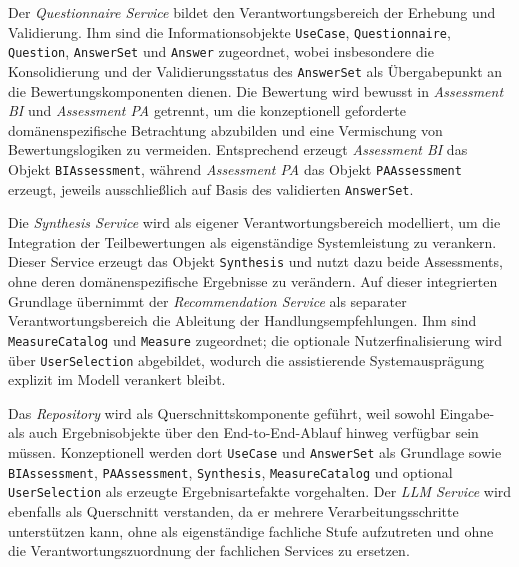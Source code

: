 Der \textit{Questionnaire Service} bildet den Verantwortungsbereich der Erhebung und Validierung. Ihm sind die Informationsobjekte \texttt{UseCase}, \texttt{Questionnaire}, \texttt{Question}, \texttt{AnswerSet} und \texttt{Answer} zugeordnet, wobei insbesondere die Konsolidierung und der Validierungsstatus des \texttt{AnswerSet} als Übergabepunkt an die Bewertungskomponenten dienen. Die Bewertung wird bewusst in \textit{Assessment BI} und \textit{Assessment PA} getrennt, um die konzeptionell geforderte domänenspezifische Betrachtung abzubilden und eine Vermischung von Bewertungslogiken zu vermeiden. Entsprechend erzeugt \textit{Assessment BI} das Objekt \texttt{BIAssessment}, während \textit{Assessment PA} das Objekt \texttt{PAAssessment} erzeugt, jeweils ausschließlich auf Basis des validierten \texttt{AnswerSet}.

Die \textit{Synthesis Service} wird als eigener Verantwortungsbereich modelliert, um die Integration der Teilbewertungen als eigenständige Systemleistung zu verankern. Dieser Service erzeugt das Objekt \texttt{Synthesis} und nutzt dazu beide Assessments, ohne deren domänenspezifische Ergebnisse zu verändern. Auf dieser integrierten Grundlage übernimmt der \textit{Recommendation Service} als separater Verantwortungsbereich die Ableitung der Handlungsempfehlungen. Ihm sind \texttt{MeasureCatalog} und \texttt{Measure} zugeordnet; die optionale Nutzerfinalisierung wird über \texttt{UserSelection} abgebildet, wodurch die assistierende Systemausprägung explizit im Modell verankert bleibt.

Das \textit{Repository} wird als Querschnittskomponente geführt, weil sowohl Eingabe- als auch Ergebnisobjekte über den End-to-End-Ablauf hinweg verfügbar sein müssen. Konzeptionell werden dort \texttt{UseCase} und \texttt{AnswerSet} als Grundlage sowie \texttt{BIAssessment}, \texttt{PAAssessment}, \texttt{Synthesis}, \texttt{MeasureCatalog} und optional \texttt{UserSelection} als erzeugte Ergebnisartefakte vorgehalten. Der \textit{LLM Service} wird ebenfalls als Querschnitt verstanden, da er mehrere Verarbeitungsschritte unterstützen kann, ohne als eigenständige fachliche Stufe aufzutreten und ohne die Verantwortungszuordnung der fachlichen Services zu ersetzen.



